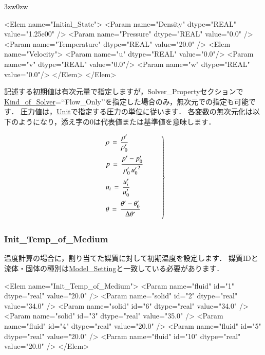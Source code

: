 \begin{indentation}{3zw}{0zw}

{\small
\begin{program}
<Elem name="Initial_State">
  <Param name="Density"     dtype="REAL" value="1.25e00" />
  <Param name="Pressure"    dtype="REAL" value="0.0" />
  <Param name="Temperature" dtype="REAL" value="20.0" />
  <Elem name="Velocity">
    <Param name="u" dtype="REAL" value="0.0"/>
    <Param name="v" dtype="REAL" value="0.0"/>
    <Param name="w" dtype="REAL" value="0.0"/>
  </Elem>
</Elem>
\end{program}
}

記述する初期値は有次元量で指定しますが，Solver\_Propertyセクションで\hyperlink{tgt:solver_property}{Kind\_of\_Solver}=\lq\lq Flow\_Only\rq\rq を指定した場合のみ，無次元での指定も可能です．
圧力値は，\hyperlink{tgt:unit}{Unit}で指定する圧力の単位に従います．
各変数の無次元化は以下のようになり，添え字の0は代表値または基準値を意味します．

\begin{equation}
\left.
\begin{array}{l}
\vspace{2mm}
\displaystyle{ \rho \,=\, \frac{\rho^{\prime}}{\rho_{0}^{\prime}} } \\
\vspace{2mm}
\displaystyle{ p \,=\, \frac{p^{\prime}-p_{0}^{\prime}}{\rho_{0}^{\prime}\,{u_{0}^{\prime}}^{2}} } \\
\vspace{2mm}
\displaystyle{ u_{i} \,=\, \frac{u_{i}^{\prime}}{u_0^{\prime}} } \\
\vspace{2mm}
\displaystyle{ \theta \,=\, \frac{\theta^{\prime}-\theta_{0}^{\prime}}{\Delta \theta^{\prime}} } 
\end{array} \qquad \right \}
\end{equation}

\end{indentation}

\vspace{3mm}
\subsubsection{Init\_Temp\_of\_Medium}
温度計算の場合に，割り当てた\hypertarget{tgt:initial_temp}{媒質}に対して初期温度を設定します．
媒質IDと流体・固体の種別は\hyperlink{tgt:model_setting}{Model\_Setting}と一致している必要があります．

{\small
\begin{program}
<Elem name="Init_Temp_of_Medium">
  <Param name="fluid" id="1"   dtype="real" value="20.0" />
  <Param name="solid" id="2"   dtype="real" value="34.0" />
  <Param name="solid" id="6"   dtype="real" value="34.0" />
  <Param name="solid" id="3"   dtype="real" value="35.0" />
  <Param name="fluid" id="4"   dtype="real" value="20.0" />
  <Param name="fluid" id="5"   dtype="real" value="20.0" />
  <Param name="fluid" id="10"  dtype="real" value="20.0" />
</Elem>
\end{program}
}

